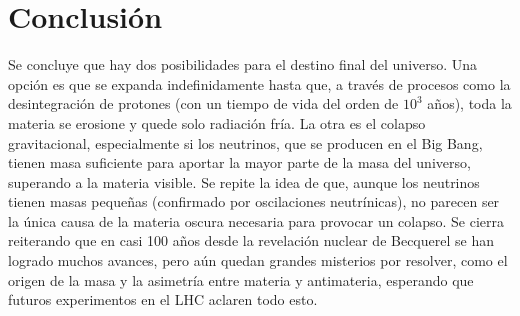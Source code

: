 \documentclass[12pt]{article}
\begin{document}
\section{Conclusión}
Se concluye que hay dos posibilidades para el destino final del universo. Una opción es que se expanda indefinidamente hasta que, a través de procesos como la desintegración de protones (con un tiempo de vida del orden de $10^{3}$ años), toda la materia se erosione y quede solo radiación fría. La otra es el colapso gravitacional, especialmente si los neutrinos, que se producen en el Big Bang, tienen masa suficiente para aportar la mayor parte de la masa del universo, superando a la materia visible. Se repite la idea de que, aunque los neutrinos tienen masas pequeñas (confirmado por oscilaciones neutrínicas), no parecen ser la única causa de la materia oscura necesaria para provocar un colapso. Se cierra reiterando que en casi 100 años desde la revelación nuclear de Becquerel se han logrado muchos avances, pero aún quedan grandes misterios por resolver, como el origen de la masa y la asimetría entre materia y antimateria, esperando que futuros experimentos en el LHC aclaren todo esto.
\end{document}
